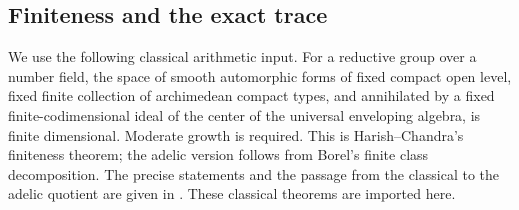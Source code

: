 \subsection{Finiteness and the exact trace}

We use the following classical arithmetic input.
For a reductive group over a number field, the space
of smooth automorphic forms of fixed compact open
level, fixed finite collection of archimedean compact
types, and annihilated by a fixed finite-codimensional
ideal of the center of the universal enveloping algebra,
is finite dimensional.  Moderate growth is required.
This is Harish--Chandra's finiteness theorem; the adelic
version follows from Borel's finite class decomposition.
The precise statements and the passage from the
classical to the adelic quotient are given in
\cite[Theorems 6.2.3 and 6.3.2]{getz-hahn-2022}.
These classical theorems are imported here.


